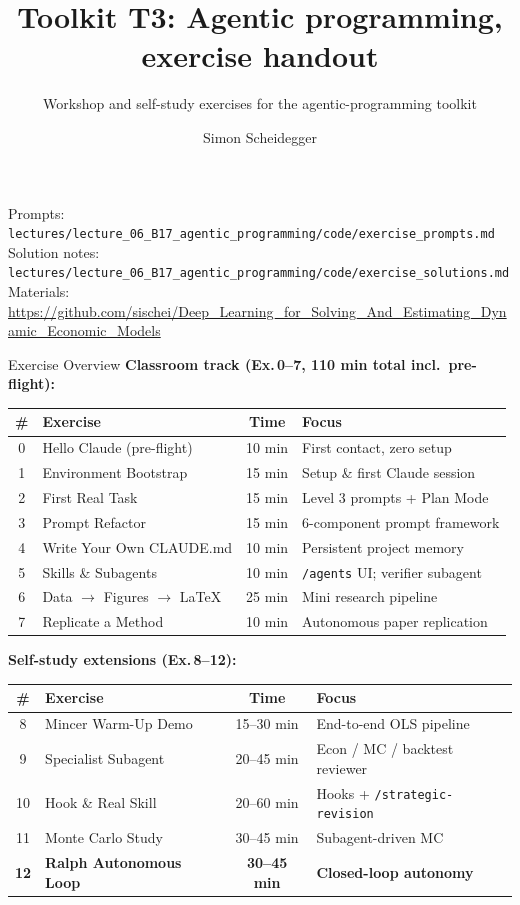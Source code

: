 \documentclass[aspectratio=169,10pt]{beamer}
\title[Toolkit T3]{Toolkit T3: Agentic programming, exercise handout}
\subtitle{Workshop and self-study exercises for the agentic-programming toolkit}
\author{Simon Scheidegger}
\institute[HEC Lausanne]{HEC, University of Lausanne}
\date{}
\newcommand{\emphc}[1]{\textcolor{harvardcrimson}{#1}}
\begin{document}
{
\begin{frame}
\titlepage
\begin{center}
{\footnotesize Prompts: \texttt{lectures/lecture\_06\_B17\_agentic\_programming/code/exercise\_prompts.md}\\
Solution notes: \texttt{lectures/lecture\_06\_B17\_agentic\_programming/code/exercise\_solutions.md}\\[2pt]
Materials: \url{https://github.com/sischei/Deep_Learning_for_Solving_And_Estimating_Dynamic_Economic_Models}}
\end{center}
\end{frame}}

\begin{frame}{Exercise Overview}
\scriptsize
\textbf{Classroom track (Ex.\,0--7, 110 min total incl.\ pre-flight):}
\renewcommand{\arraystretch}{1.05}
\begin{center}
\begin{tabular}{c l c l}
\toprule
\textbf{\#} & \textbf{Exercise} & \textbf{Time} & \textbf{Focus} \\
\midrule
0 & Hello Claude (\emphc{pre-flight}) & 10 min & First contact, zero setup \\
1 & Environment Bootstrap & 15 min & Setup \& first Claude session \\
2 & First Real Task & 15 min & Level 3 prompts + Plan Mode \\
3 & Prompt Refactor & 15 min & 6-component prompt framework \\
4 & Write Your Own CLAUDE.md & 10 min & Persistent project memory \\
5 & Skills \& Subagents & 10 min & \texttt{/agents} UI; verifier subagent \\
6 & Data $\to$ Figures $\to$ LaTeX & 25 min & Mini research pipeline \\
7 & Replicate a Method & 10 min & Autonomous paper replication \\
\bottomrule
\end{tabular}
\end{center}

\vspace{0.4em}
\textbf{Self-study extensions (Ex.\,8--12):}
\begin{center}
\begin{tabular}{c l c l}
\toprule
\textbf{\#} & \textbf{Exercise} & \textbf{Time} & \textbf{Focus} \\
\midrule
8  & Mincer Warm-Up Demo & 15--30 min & End-to-end OLS pipeline \\
9  & Specialist Subagent & 20--45 min & Econ / MC / backtest reviewer \\
10 & Hook \& Real Skill & 20--60 min & Hooks + \texttt{/strategic-revision} \\
11 & Monte Carlo Study & 30--45 min & Subagent-driven MC \\
\textbf{12} & \textbf{Ralph Autonomous Loop} & \textbf{30--45 min} & \textbf{Closed-loop autonomy} \\
\bottomrule
\end{tabular}
\end{center}


\end{frame}
\end{document}
